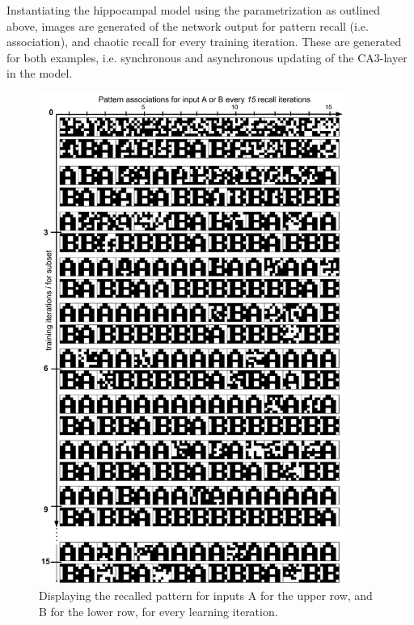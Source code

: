 Instantiating the hippocampal model using the parametrization as outlined above, images are generated of the network output for pattern recall (i.e. association), and chaotic recall for every training iteration. These are generated for both examples, i.e. synchronous and asynchronous updating of the CA3-layer in the model.

\begin{figure}
    \centering
    \includegraphics[width=10cm]{fig/AB-pattern-associations-sync-tm0-dgw25}
    \caption{Displaying the recalled pattern for inputs A for the upper row, and B for the lower row, for every learning iteration.}
    \label{fig:pattern_associations_sync}
\end{figure}

